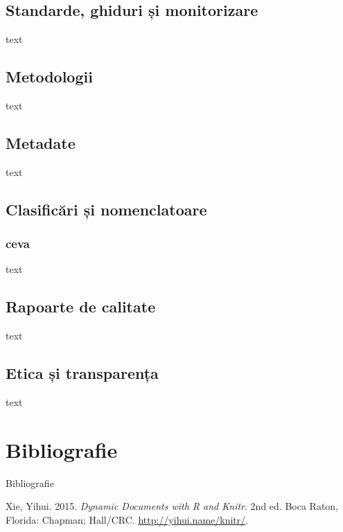 \documentclass[
  11pt,
  b5paper,
  nottoc]{book}
\newlength{\cslhangindent}
\newlength{\cslentryspacingunit} %
\newenvironment{CSLReferences}[2] %
 {%
  \setlength{\parindent}{0pt}
  \ifodd #1
  \let\oldpar\par
  \def\par{\hangindent=\cslhangindent\oldpar}
  \fi
  \setlength{\parskip}{#2\cslentryspacingunit}
 }%
 {}
\begin{document}
\hypertarget{standarde-ghiduri-ux219i-monitorizare}{%
\section{Standarde, ghiduri și
monitorizare}\label{standarde-ghiduri-ux219i-monitorizare}}

text

\hypertarget{metodologii}{%
\section{Metodologii}\label{metodologii}}

text

\hypertarget{metadate}{%
\section{Metadate}\label{metadate}}

text

\hypertarget{clasificux103ri-ux219i-nomenclatoare}{%
\section{Clasificări și
nomenclatoare}\label{clasificux103ri-ux219i-nomenclatoare}}

\hypertarget{ceva}{%
\subsection{ceva}\label{ceva}}

text

\hypertarget{rapoarte-de-calitate}{%
\section{Rapoarte de calitate}\label{rapoarte-de-calitate}}

text

\hypertarget{etica-ux219i-transparenux21ba}{%
\section{Etica și transparența}\label{etica-ux219i-transparenux21ba}}

text


\hypertarget{bibliografie}{%
\chapter*{Bibliografie}\label{bibliografie}}


Bibliografie

\hypertarget{refs}{}
\begin{CSLReferences}{1}{0}
\leavevmode{}%
Xie, Yihui. 2015. \emph{Dynamic Documents with {R} and Knitr}. 2nd ed.
Boca Raton, Florida: Chapman; Hall/CRC. \url{http://yihui.name/knitr/}.

\end{CSLReferences}


\backmatter
\end{document}
